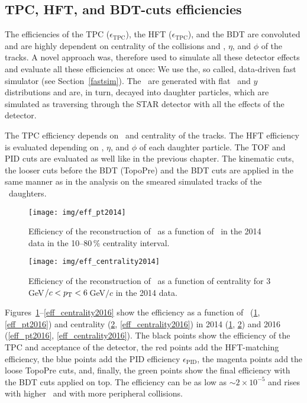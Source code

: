 \subsection{TPC, HFT, and BDT-cuts efficiencies}





The efficiencies of the TPC ($\epsilon_\mathrm{TPC}$), the HFT ($\epsilon_\mathrm{TPC}$), and the BDT are convoluted and are highly dependent on centrality of the collisions and \pt, $\eta$, and $\phi$ of the tracks. A novel approach was, therefore used to simulate all these detector effects and evaluate all these efficiencies at once: We use the, so called, data-driven fast simulator (see Section~\ref{fastsim})\@. The \Lambdac\ are generated with flat \pt\ and $y$ distributions and are, in turn, decayed into daughter particles, which are simulated as traversing through the STAR detector with all the effects of the detector. 


The TPC efficiency depends on \pt\ and centrality of the tracks. The HFT efficiency is evaluated depending on \pt, $\eta$, and $\phi$ of each daughter particle. The TOF and PID cuts are evaluated as well like in the previous chapter. The kinematic cuts, the looser cuts before the BDT (TopoPre) and the BDT cuts are applied in the same manner as in the analysis on the smeared simulated tracks of the \Lambdac\ daughters.


\begin{figure}[!p]
\centering
\texttt{[image: img/eff\_pt2014]}
\caption{\label{eff_pt2014} Efficiency of the reconstruction of \Lambdac\ as a function of \pt\ in the 2014 data in the 10--80$\,\%$ centrality interval.}
\end{figure}

\begin{figure}[!p]
\centering
\texttt{[image: img/eff\_centrality2014]}
\caption{\label{eff_centrality2014} Efficiency of the reconstruction of \Lambdac\ as a function of centrality for $3\,$GeV$/c < {p_{\mathrm{T}}} < 6\,$GeV$/c$ in the 2014 data.}
\end{figure}



Figures~\ref{eff_pt2014}--\ref{eff_centrality2016} show the efficiency as a function of \pt\ (\ref{eff_pt2014}, \ref{eff_pt2016}) and centrality (\ref{eff_centrality2014}, \ref{eff_centrality2016}) in 2014 (\ref{eff_pt2014}, \ref{eff_centrality2014}) and 2016 (\ref{eff_pt2016}, \ref{eff_centrality2016}). The black points show the efficiency of the TPC and acceptance of the detector, the red points add the HFT-matching efficiency, the blue points add the PID efficiency $\epsilon_\mathrm{PID}$, the magenta points add the loose TopoPre cuts, and, finally, the green points show the final efficiency with the BDT cuts applied on top. The efficiency can be as low as $\sim2\times10^{-5}$ and rises with higher \pt\ and with more peripheral collisions.

